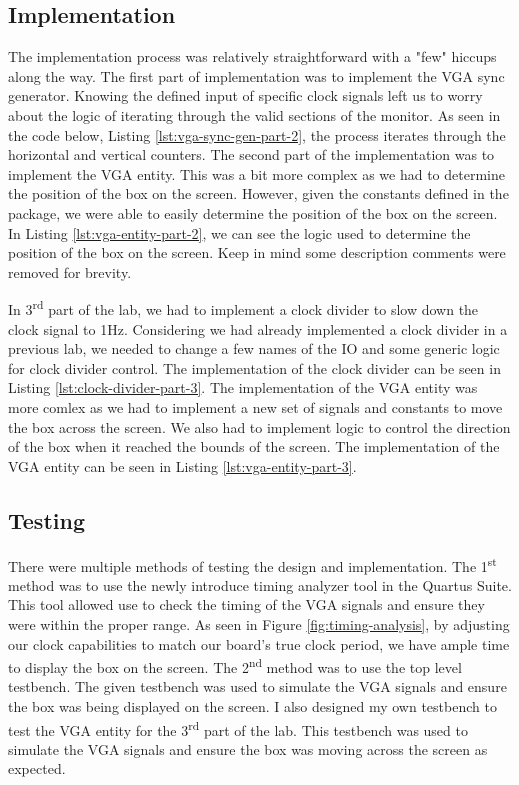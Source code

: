 \documentclass{article}
\begin{document}
\subsection*{Implementation}
The implementation process was relatively straightforward with a "few" hiccups along the way. The first part of implementation was to implement the VGA sync generator. Knowing the defined input of specific clock signals left us to worry about the logic of iterating through the valid sections of the monitor. As seen in the code below, Listing \ref{lst:vga-sync-gen-part-2}, the process iterates through the horizontal and vertical counters. The second part of the implementation was to implement the VGA entity. This was a bit more complex as we had to determine the position of the box on the screen. However, given the constants defined in the package, we were able to easily determine the position of the box on the screen. In Listing \ref{lst:vga-entity-part-2}, we can see the logic used to determine the position of the box on the screen. Keep in mind some description comments were removed for brevity.

In 3\textsuperscript{rd} part of the lab, we had to implement a clock divider to slow down the clock signal to 1Hz. Considering we had already implemented a clock divider in a previous lab, we needed to change a few names of the IO and some generic logic for clock divider control. The implementation of the clock divider can be seen in Listing \ref{lst:clock-divider-part-3}. The implementation of the VGA entity was more comlex as we had to implement a new set of signals and constants to move the box across the screen. We also had to implement logic to control the direction of the box when it reached the bounds of the screen. The implementation of the VGA entity can be seen in Listing \ref{lst:vga-entity-part-3}.

\subsection*{Testing}
There were multiple methods of testing the design and implementation. The 1\textsuperscript{st} method was to use the newly introduce timing analyzer tool in the Quartus Suite. This tool allowed use to check the timing of the VGA signals and ensure they were within the proper range. As seen in Figure \ref*{fig:timing-analysis}, by adjusting our clock capabilities to match our board's true clock period, we have ample time to display the box on the screen. The 2\textsuperscript{nd} method was to use the top level testbench. The given testbench was used to simulate the VGA signals and ensure the box was being displayed on the screen. I also designed my own testbench to test the VGA entity for the 3\textsuperscript{rd} part of the lab. This testbench was used to simulate the VGA signals and ensure the box was moving across the screen as expected.
\end{document}
